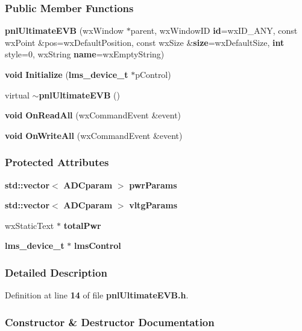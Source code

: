 \subsubsection*{Public Member Functions}
\begin{DoxyCompactItemize}
\item 
{\bf pnl\+Ultimate\+E\+VB} (wx\+Window $\ast$parent, wx\+Window\+ID {\bf id}=wx\+I\+D\+\_\+\+A\+NY, const wx\+Point \&pos=wx\+Default\+Position, const wx\+Size \&{\bf size}=wx\+Default\+Size, {\bf int} style=0, wx\+String {\bf name}=wx\+Empty\+String)
\item 
{\bf void} {\bf Initialize} ({\bf lms\+\_\+device\+\_\+t} $\ast$p\+Control)
\item 
virtual {\bf $\sim$pnl\+Ultimate\+E\+VB} ()
\item 
{\bf void} {\bf On\+Read\+All} (wx\+Command\+Event \&event)
\item 
{\bf void} {\bf On\+Write\+All} (wx\+Command\+Event \&event)
\end{DoxyCompactItemize}
\subsubsection*{Protected Attributes}
\begin{DoxyCompactItemize}
\item 
{\bf std\+::vector}$<$ {\bf A\+D\+Cparam} $>$ {\bf pwr\+Params}
\item 
{\bf std\+::vector}$<$ {\bf A\+D\+Cparam} $>$ {\bf vltg\+Params}
\item 
wx\+Static\+Text $\ast$ {\bf total\+Pwr}
\item 
{\bf lms\+\_\+device\+\_\+t} $\ast$ {\bf lms\+Control}
\end{DoxyCompactItemize}


\subsubsection{Detailed Description}


Definition at line {\bf 14} of file {\bf pnl\+Ultimate\+E\+V\+B.\+h}.



\subsubsection{Constructor \& Destructor Documentation}

